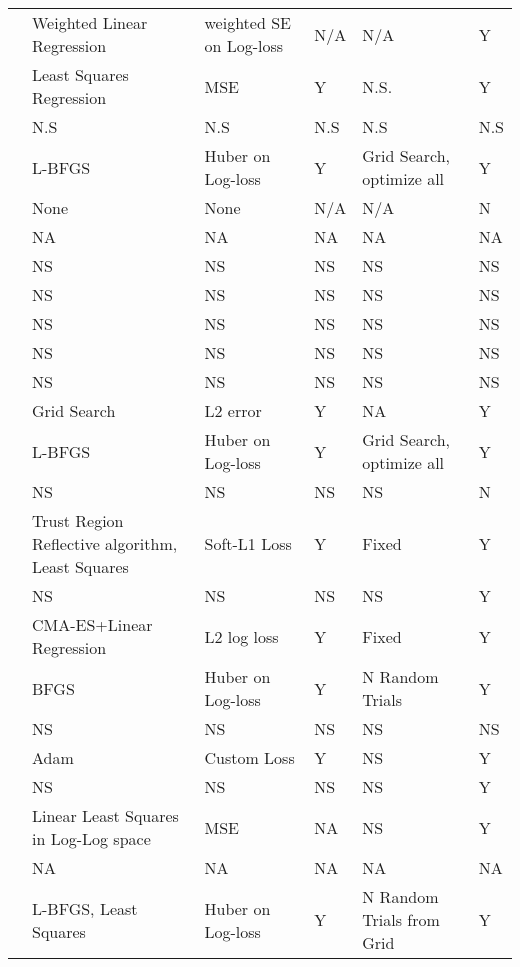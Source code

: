 \begin{table}[]
{\begin{tabular}{llllll}
\cite{porian2024resolving} & Weighted Linear Regression & weighted SE on Log-loss & N/A & N/A & Y \\
\cite{alabdulmohsin2022revisiting} & Least Squares Regression & MSE & Y & N.S. & Y \\
\cite{gao2024scalingevaluatingsparseautoencoders} & N.S & N.S & N.S & N.S & N.S \\
\cite{muennighoff2024scaling} & L-BFGS & Huber on Log-loss & Y & Grid Search, optimize all & Y \\
\cite{rae2021scaling} & None & None & N/A & N/A & N \\
\cite{shin2023scaling} & NA & NA & NA & NA & NA \\
\cite{hernandez2022scaling} & NS & NS & NS & NS & NS \\
\cite{filipovich2022scaling} & NS & NS & NS & NS & NS \\
\cite{neumann2022scaling} & NS & NS & NS & NS & NS \\
\cite{droppo2021scaling} & NS & NS & NS & NS & NS \\
\cite{henighan2020scaling} & NS & NS & NS & NS & NS \\
\cite{goyal2024scaling} & Grid Search & L2 error & Y & NA & Y \\
\cite{aghajanyan2023scaling} & L-BFGS & Huber on Log-loss & Y & Grid Search, optimize all & Y \\
\cite{kaplan2020scaling} & NS & NS & NS & NS & N \\
\cite{ghorbani2021scaling} & Trust Region Reflective algorithm, Least Squares & Soft-L1 Loss & Y & Fixed & Y \\
\cite{gao2023scaling} & NS & NS & NS & NS & Y \\
\cite{hilton2023scaling} & CMA-ES+Linear Regression & L2 log loss & Y & Fixed & Y \\
\cite{frantar2023scaling} & BFGS & Huber on Log-loss & Y & N Random Trials & Y \\
\cite{prato2021scaling} & NS & NS & NS & NS & NS \\
\cite{covert2024scaling} & Adam & Custom Loss & Y & NS & Y \\
\cite{hernandez2021scaling} & NS & NS & NS & NS & Y \\
\cite{ivgi2022scaling} & Linear Least Squares in Log-Log space & MSE & NA & NS & Y \\
\cite{tay2022scaling} & NA & NA & NA & NA & NA \\
\cite{tao2024scaling} & L-BFGS, Least Squares & Huber on Log-loss & Y & N Random Trials from Grid & Y \\

\end{tabular}}
\end{table}
